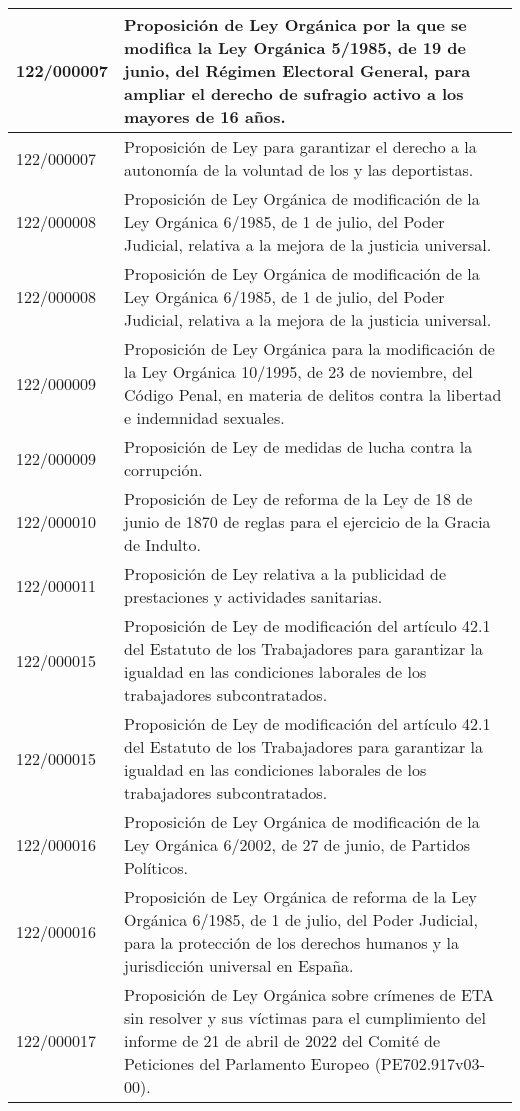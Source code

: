 {\begin{table}[H]
\begin{center}
\begin{tabularx}{\linewidth}{| l | X |}
\hline
122/000007 & Proposición de Ley Orgánica por la que se modifica la Ley Orgánica 5/1985, de 19 de junio, del Régimen Electoral General, para ampliar el derecho de sufragio activo a los mayores de 16 años. \\
\hline
122/000007 & Proposición de Ley para garantizar el derecho a la autonomía de la voluntad de los y las deportistas. \\
\hline
122/000008 & Proposición de Ley Orgánica de modificación de la Ley Orgánica 6/1985, de 1 de julio, del Poder Judicial, relativa a la mejora de la justicia universal. \\
\hline
122/000008 & Proposición de Ley Orgánica de modificación de la Ley Orgánica 6/1985, de 1 de julio, del Poder Judicial, relativa a la mejora de la justicia universal. \\
\hline
122/000009 & Proposición de Ley Orgánica para la modificación de la Ley Orgánica 10/1995, de 23 de noviembre, del Código Penal, en materia de delitos contra la libertad e indemnidad sexuales. \\
\hline
122/000009 & Proposición de Ley de medidas de lucha contra la corrupción. \\
\hline
122/000010 & Proposición de Ley de reforma de la Ley de 18 de junio de 1870 de reglas para el ejercicio de la Gracia de Indulto. \\
\hline
122/000011 & Proposición de Ley relativa a la publicidad de prestaciones y actividades sanitarias. \\
\hline
122/000015 & Proposición de Ley de modificación del artículo 42.1 del Estatuto de los Trabajadores para garantizar la igualdad en las condiciones laborales de los trabajadores subcontratados. \\
\hline
122/000015 & Proposición de Ley de modificación del artículo 42.1 del Estatuto de los Trabajadores para garantizar la igualdad en las condiciones laborales de los trabajadores subcontratados. \\
\hline
122/000016 & Proposición de Ley Orgánica de modificación de la Ley Orgánica 6/2002, de 27 de junio, de Partidos Políticos. \\
\hline
122/000016 & Proposición de Ley Orgánica de reforma de la Ley Orgánica 6/1985, de 1 de julio, del Poder Judicial, para la protección de los derechos humanos y la jurisdicción universal en España. \\
\hline
122/000017 & Proposición de Ley Orgánica sobre crímenes de ETA sin resolver y sus víctimas para el cumplimiento del informe de 21 de abril de 2022 del Comité de Peticiones del Parlamento Europeo (PE702.917v03-00). \\

\end{tabularx}
\end{center}
\end{table}}

